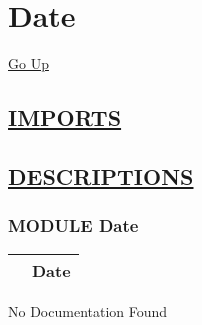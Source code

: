 \chapter*{\color{headfile}
Date
}
\hypertarget{ecldoc:toc:Date}{}
\hyperlink{ecldoc:toc:root}{Go Up}

\section*{\underline{\textsf{IMPORTS}}}
\begin{doublespace}
{\large
}
\end{doublespace}

\section*{\underline{\textsf{DESCRIPTIONS}}}
\subsection*{\textsf{\colorbox{headtoc}{\color{white} MODULE}
Date}}

\hypertarget{ecldoc:Date}{}

{\renewcommand{\arraystretch}{1.5}
\begin{tabularx}{\textwidth}{|>{\raggedright\arraybackslash}l|X|}
\hline
\hspace{0pt}\mytexttt{\color{red} } & \textbf{Date} \\
\hline
\end{tabularx}
}

\par





No Documentation Found







